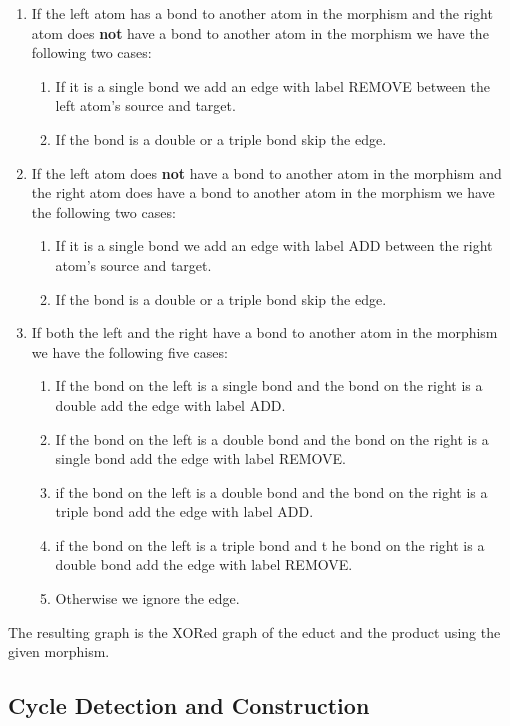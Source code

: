 \documentclass{article}
\begin{document}
\begin{enumerate}
    \item If the left atom has a bond to another atom in the morphism and the right atom does \textbf{not} have a bond to another atom in the morphism we have the following two cases:
    \begin{enumerate}
        \item If it is a single bond we add an edge with label REMOVE between the left atom's source and target.
        \item If the bond is a double or a triple bond skip the edge.
    \end{enumerate}
    \item If the left atom does \textbf{not} have a bond to another atom in the morphism and the right atom does have a bond to another atom in the morphism we have the following two cases:
    \begin{enumerate}
        \item If it is a single bond we add an edge with label ADD between the right atom's source and target.
        \item If the bond is a double or a triple bond skip the edge.
    \end{enumerate}
    \item If both the left and the right have a bond to another atom in the morphism we have the following five cases:
    \begin{enumerate}
        \item If the bond on the left is a single bond and the bond on the right is a double add the edge with label ADD.
        \item If the bond on the left is a double bond and the bond on the right is a single bond add the edge with label REMOVE.
        \item if the bond on the left is a double bond and the bond on the right is a triple bond add the edge with label ADD.
        \item if the bond on the left is a triple bond and t he bond on the right is a double bond add the edge with label REMOVE.
        \item Otherwise we ignore the edge.
    \end{enumerate}
\end{enumerate}
The resulting graph is the XORed graph of the educt and the product using the given morphism.

\subsection{Cycle Detection and Construction}
\end{document}
